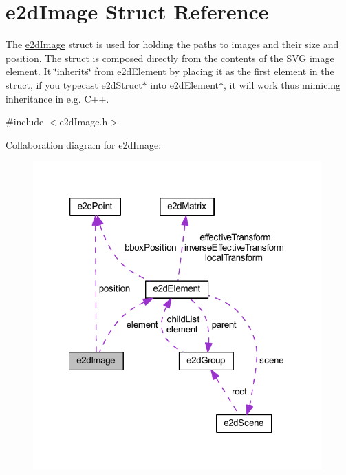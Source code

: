 \hypertarget{structe2dImage}{\section{e2d\-Image Struct Reference}
\label{structe2dImage}
}


The \hyperlink{structe2dImage}{e2d\-Image} struct is used for holding the paths to images and their size and position. The struct is composed directly from the contents of the S\-V\-G image element. It \char`\"{}inherits\char`\"{} from \hyperlink{structe2dElement}{e2d\-Element} by placing it as the first element in the struct, if you typecast e2d\-Struct$\ast$ into e2d\-Element$\ast$, it will work thus mimicing inheritance in e.\-g. C++.  




{\ttfamily \#include $<$e2d\-Image.\-h$>$}



Collaboration diagram for e2d\-Image\-:
\nopagebreak
\begin{figure}[H]
\begin{center}
\leavevmode
\includegraphics[width=314pt]{structe2dImage__coll__graph}
\end{center}
\end{figure}
